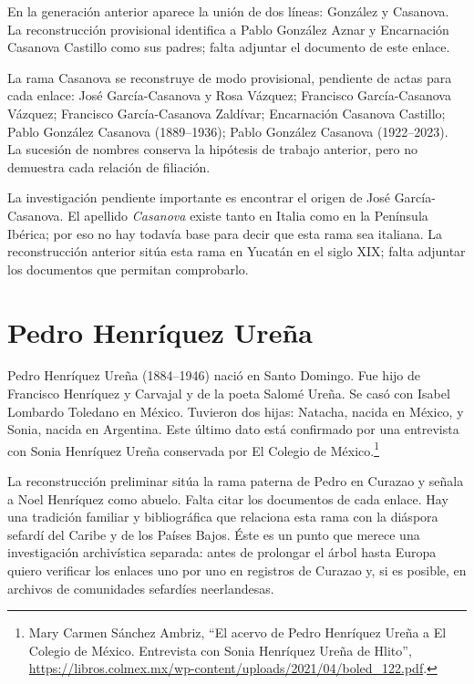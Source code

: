 En la generación anterior aparece la unión
de dos líneas: González y Casanova.
La reconstrucción provisional identifica
a Pablo González Aznar y Encarnación
Casanova Castillo como sus padres; falta
adjuntar el documento de este enlace.

La rama Casanova se reconstruye de modo
provisional, pendiente de
actas para cada enlace: José García-Casanova
y Rosa Vázquez; Francisco García-Casanova
Vázquez; Francisco García-Casanova Zaldívar;
Encarnación Casanova Castillo; Pablo González
Casanova (1889--1936); Pablo González
Casanova (1922--2023). La sucesión de nombres
conserva la hipótesis de trabajo anterior,
pero no demuestra cada relación de filiación.



La investigación pendiente importante es encontrar
el origen de José García-Casanova. El apellido
\emph{Casanova} existe tanto en Italia como en la
Península Ibérica; por eso no hay todavía base para
decir que esta rama sea italiana.
La reconstrucción anterior sitúa esta rama
en Yucatán en el siglo XIX; falta adjuntar
los documentos que permitan comprobarlo.

\section{Pedro Henríquez Ureña}
\label{section-genealogia-henriquez-urena}

Pedro Henríquez Ureña (1884--1946) nació en Santo
Domingo. Fue hijo de Francisco Henríquez y Carvajal
y de la poeta Salomé Ureña. Se casó con Isabel
Lombardo Toledano en México. Tuvieron dos hijas:
Natacha, nacida en México, y Sonia, nacida en
Argentina. Este último dato está confirmado por una
entrevista con Sonia Henríquez Ureña conservada por
El Colegio de México.\footnote{%
Mary Carmen Sánchez Ambriz, ``El acervo de Pedro
Henríquez Ureña a El Colegio de México. Entrevista
con Sonia Henríquez Ureña de Hlito'',
\url{https://libros.colmex.mx/wp-content/uploads/2021/04/boled_122.pdf}.}

La reconstrucción preliminar sitúa la
rama paterna de Pedro en Curazao y señala
a Noel Henríquez como abuelo. Falta citar
los documentos de cada enlace.
Hay una tradición familiar y
bibliográfica que relaciona esta rama con la
diáspora sefardí del Caribe y de los Países Bajos.
Éste es un punto que merece una investigación
archivística separada: antes de prolongar el árbol
hasta Europa quiero verificar los enlaces uno por
uno en registros de Curazao y, si es posible, en
archivos de comunidades sefardíes neerlandesas.

